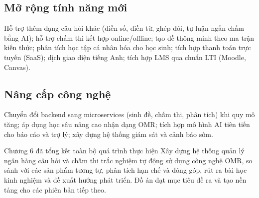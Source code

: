 ﻿\documentclass[../DoAn.tex]{subfiles}
\begin{document}
\subsection{Mở rộng tính năng mới}
Hỗ trợ thêm dạng câu hỏi khác (điền số, điền từ, ghép đôi, tự luận ngắn chấm bằng AI); hỗ trợ chấm thi kết hợp online/offline; tạo đề thông minh theo ma trận kiến thức; phân tích học tập cá nhân hóa cho học sinh; tích hợp thanh toán trực tuyến (SaaS); dịch giao diện tiếng Anh; tích hợp LMS qua chuẩn LTI (Moodle, Canvas).

\subsection{Nâng cấp công nghệ}
Chuyển đổi backend sang microservices (sinh đề, chấm thi, phân tích) khi quy mô tăng; áp dụng học sâu nâng cao nhận dạng OMR; tích hợp mô hình AI tiên tiến cho báo cáo và trợ lý; xây dựng hệ thống giám sát và cảnh báo sớm.

Chương 6 đã tổng kết toàn bộ quá trình thực hiện Xây dựng hệ thống quản lý ngân hàng câu hỏi và chấm thi trắc nghiệm tự động sử dụng công nghệ OMR, so sánh với các sản phẩm tương tự, phân tích hạn chế và đóng góp, rút ra bài học kinh nghiệm và đề xuất hướng phát triển. Đồ án đạt mục tiêu đề ra và tạo nền tảng cho các phiên bản tiếp theo.
\end{document}
